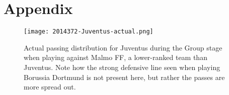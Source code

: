 \documentclass[11pt,letterpaper]{article}
\begin{document}
\appendix
 \section{Appendix}
\begin{figure}
\caption{Actual passing distribution for Juventus during the Group stage when playing against Malmo FF, a lower-ranked team than Juventus. Note how the strong defensive line seen when playing Borussia Dortmund is not present here, but rather the passes are more spread out.}
\centering
\texttt{[image: 2014372-Juventus-actual.png]}
\label{fig:Juventus-group}
\end{figure}
\end{document}
